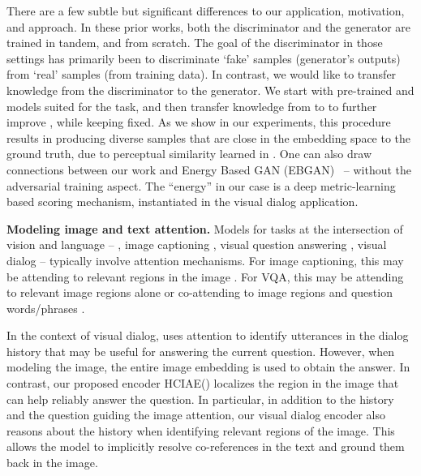 \documentclass{article}
\newcommand{\ourenc}{HCIAE\xspace}
\begin{document}
There are a few subtle but significant differences \wrt to our application, motivation, and approach. 
In these prior works, both the discriminator and the 
generator are trained in tandem, and from scratch.
The goal of the discriminator in those settings has primarily been to 
discriminate `fake' samples (\ie generator's outputs) from `real' samples 
(\ie from training data). In contrast, we would like to  transfer 
knowledge from the discriminator to the generator. We start with pre-trained  and  models 
suited for the task, and then transfer knowledge from  to 
 to further improve , while keeping  fixed. 
As we show in our experiments, this procedure results in 
 producing diverse samples that are close in the embedding space to the ground truth, 
due to perceptual similarity learned in .  
One can also draw connections between our work and Energy Based GAN (EBGAN)~\cite{ebgan} -- 
without the adversarial training aspect. The ``energy'' in our case is a deep metric-learning based scoring mechanism, 
instantiated in the visual dialog application.


{\bf Modeling image and text attention.} 
Models for tasks at the intersection of vision and language -- \eg, image captioning 
\cite{donahue_cvpr15, fang_cvpr15, karpathy_cvpr15, vinyals2015show}, visual question 
answering \cite{antol2015vqa, gao2015you, malinowski2015ask, ren2015exploring},
visual dialog \cite{visdial, de2016guesswhat, das2017learning, strub2017end,mostafazadeh2017image} -- typically 
involve attention mechanisms. For image captioning, this may be attending to relevant 
regions in the image \cite{vinyals2015show,showattendtell15,LuXPS16}. 
For VQA, this may be attending to relevant image regions alone \cite{chen2015abc, xu2016ask,yang2016stacked} or 
co-attending to image regions and question words/phrases \cite{lu2016hierarchical}. 

In the context of visual dialog, \cite{visdial} uses attention to identify utterances in 
the dialog history that may be useful for answering the current question. However, when 
modeling the image, the entire image embedding is used to obtain the answer. In contrast, 
our proposed encoder \ourenc () localizes the region in the image that can help  
reliably answer the question. In particular, in addition to the history and the question guiding the image 
attention, our visual dialog encoder also reasons about 
the history when identifying relevant regions of the image. 
This allows the model to implicitly resolve co-references in the text and ground them back in the image.
\end{document}
